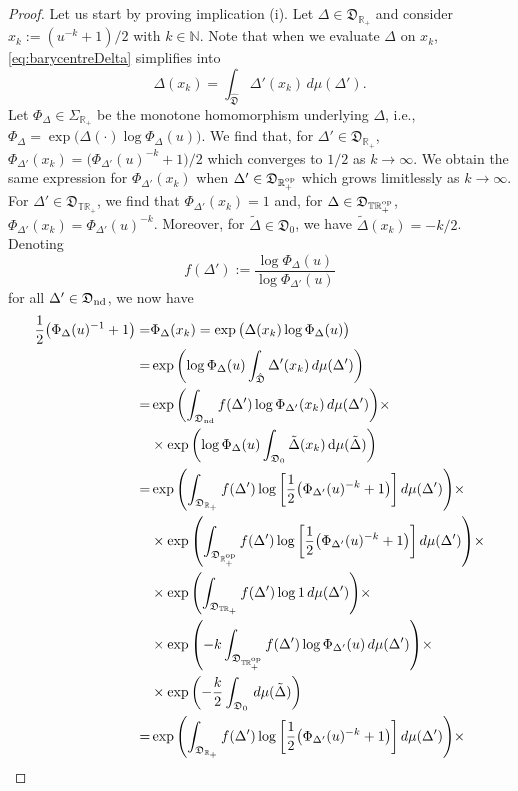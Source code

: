 \documentclass[12pt,a4paper,reqno]{amsart}
\theoremstyle{definition}
\newcommand{\mf}[1]{\mathfrak{#1}}
\newcommand{\N}{\mathbb N}
\newcommand{\R}{\mathbb R}
\newcommand{\T}{\mathbb T}
\def\d{{\mathrm d}}
\let\originalleft\left
\let\originalright\right
\renewcommand{\left}{\mathopen{}\mathclose\bgroup\originalleft}
\renewcommand{\right}{\aftergroup\egroup\originalright}
\begin{document}
\begin{proof}
Let us start by proving implication (i). Let $\Delta\in\mf D_{\R_+}$ and consider $x_k:=(u^{-k}+1)/2$ with $k\in\N$. Note that when we evaluate $\Delta$ on $x_k$, \eqref{eq:barycentreDelta} simplifies into
$$
\Delta(x_k)=\int_{\hat{\mf D}}\Delta'(x_k)\,d\mu(\Delta').
$$
Let $\Phi_\Delta\in\Sigma_{\R_+}$ be the monotone homomorphism underlying $\Delta$, i.e., $\Phi_\Delta=\exp{\big(\Delta(\cdot)\log{\Phi_\Delta(u)}\big)}$. We find that, for $\Delta'\in\mf D_{\R_+}$, $\Phi_{\Delta'}(x_k)=\big(\Phi_{\Delta'}(u)^{-k}+1\big)/2$ which converges to $1/2$ as $k\to\infty$. We obtain the same expression for $\Phi_{\Delta'}(x_k)$ when $\Delta'\in\mf D_{\R_+^{\rm op}}$ which grows limitlessly as $k\to\infty$. For $\Delta'\in\mf D_{\T\R_+}$, we find that $\Phi_{\Delta'}(x_k)=1$ and, for $\Delta\in\mf D_{\T\R_+^{\rm op}}$, $\Phi_{\Delta'}(x_k)=\Phi_{\Delta'}(u)^{-k}$. Moreover, for $\tilde{\Delta}\in\mf D_0$, we have $\tilde{\Delta}(x_k)=-k/2$. Denoting
$$
f(\Delta'):=\frac{\log{\Phi_\Delta}(u)}{\log{\Phi_{\Delta'}(u)}}
$$
for all $\Delta'\in\mf D_{\rm nd}$, we now have
\begin{align*}
\frac{1}{2}\big(\Phi_\Delta(u)^{-1}+1\big)=&\Phi_\Delta(x_k)=\exp{\big(\Delta(x_k)\log{\Phi_\Delta(u)}\big)}\\
=&\exp{\left(\log{\Phi_\Delta(u)}\int_{\hat{\mf D}}\Delta'(x_k)\,d\mu(\Delta')\right)}\\
=&\exp{\left(\int_{\mf D_{\rm nd}}f(\Delta')\log{\Phi_{\Delta'}(x_k)}\,d\mu(\Delta')\right)}\times\\
&\times\exp{\left(\log{\Phi_\Delta(u)}\int_{\mf D_0}\tilde{\Delta}(x_k)\,\d\mu(\tilde{\Delta})\right)}\\
=&\exp{\left(\int_{\mf D_{\R_+}}f(\Delta')\log{\left[\frac{1}{2}\big(\Phi_{\Delta'}(u)^{-k}+1\big)\right]}\,d\mu(\Delta')\right)}\times\\
&\times \exp{\left(\int_{\mf D_{\R_+^{\rm op}}}f(\Delta')\log{\left[\frac{1}{2}\big(\Phi_{\Delta'}(u)^{-k}+1\big)\right]}\,d\mu(\Delta')\right)}\times\\
&\times\exp{\left(\int_{\mf D_{\T\R_+}}f(\Delta')\log{1}\,d\mu(\Delta')\right)}\times\\
&\times\exp{\left(-k\int_{\mf D_{\T\R_+^{\rm op}}}f(\Delta')\log{\Phi_{\Delta'}(u)}\,d\mu(\Delta')\right)}\times\\
&\times\exp{\left(-\frac{k}{2}\int_{\mf D_0}\,d\mu(\tilde{\Delta})\right)}\\
=&\exp{\left(\int_{\mf D_{\R_+}}f(\Delta')\log{\left[\frac{1}{2}\big(\Phi_{\Delta'}(u)^{-k}+1\big)\right]}\,d\mu(\Delta')\right)}\times\\

\end{align*}
\end{proof}
\end{document}
